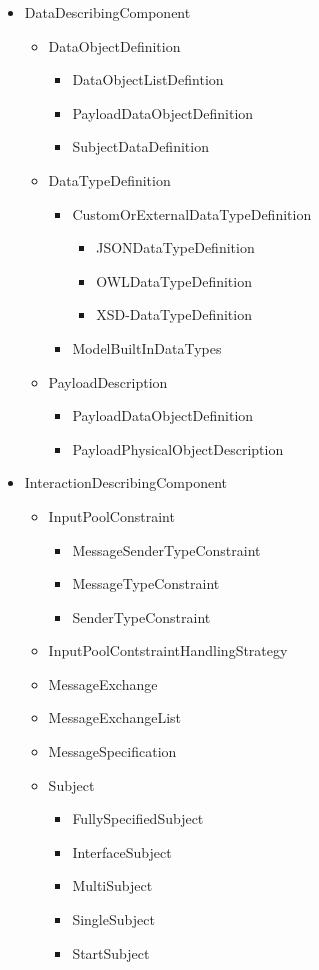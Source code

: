 \begin{itemize}
\begin{itemize}
	\item DataDescribingComponent
	\begin{itemize}
		\item DataObjectDefinition
		\begin{itemize}
			\item DataObjectListDefintion
			\item PayloadDataObjectDefinition
			\item SubjectDataDefinition
		\end{itemize}
		\item DataTypeDefinition
		\begin{itemize}
			\item CustomOrExternalDataTypeDefinition
			\begin{itemize}
					\item JSONDataTypeDefinition
					\item OWLDataTypeDefinition
					\item XSD-DataTypeDefinition
			\end{itemize}
			\item ModelBuiltInDataTypes
		\end{itemize}
		\item PayloadDescription
		\begin{itemize}
			\item PayloadDataObjectDefinition
			\item PayloadPhysicalObjectDescription
		\end{itemize}
	\end{itemize}
	\item InteractionDescribingComponent
	\begin{itemize}
		\item InputPoolConstraint
		\begin{itemize}
			\item MessageSenderTypeConstraint
			\item MessageTypeConstraint
			\item SenderTypeConstraint
		\end{itemize}
		\item InputPoolContstraintHandlingStrategy
		\item MessageExchange
		\item MessageExchangeList
		\item MessageSpecification
		\item Subject
		\begin{itemize}
			\item FullySpecifiedSubject
			\item InterfaceSubject
			\item MultiSubject
			\item SingleSubject
			\item StartSubject
		\end{itemize}
	\end{itemize}
				

\end{itemize}
\end{itemize}
